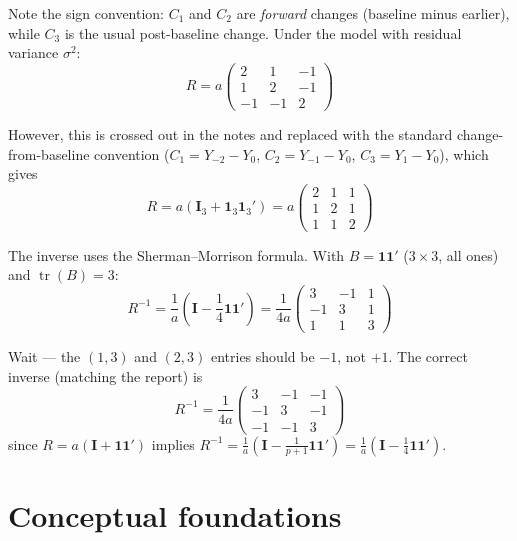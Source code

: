 \documentclass[11pt]{article}
\DeclareMathOperator{\tr}{tr}
\newcommand{\bI}{\mathbf{I}}
\newcommand{\bone}{\mathbf{1}}
\begin{document}
Note the sign convention: $C_1$ and $C_2$ are
\emph{forward} changes (baseline minus earlier), while
$C_3$ is the usual post-baseline change. Under the
model with residual variance $\sigma^2$:
\begin{equation}
  R = a\begin{pmatrix}
    2 & 1 & -1 \\ 1 & 2 & -1 \\ -1 & -1 & 2
  \end{pmatrix}
\end{equation}

However, this is crossed out in the notes and replaced
with the standard change-from-baseline convention
($C_1 = Y_{-2} - Y_0$, $C_2 = Y_{-1} - Y_0$,
$C_3 = Y_1 - Y_0$), which gives
\begin{equation}
  R = a(\bI_3 + \bone_3 \bone_3')
  = a\begin{pmatrix}
    2 & 1 & 1 \\ 1 & 2 & 1 \\ 1 & 1 & 2
  \end{pmatrix}
\end{equation}

The inverse uses the Sherman--Morrison formula. With
$B = \bone\bone'$ ($3 \times 3$, all ones) and
$\tr(B) = 3$:
\begin{equation}
  R^{-1} = \frac{1}{a}\left(
    \bI - \frac{1}{4}\bone\bone'
  \right)
  = \frac{1}{4a}\begin{pmatrix}
    3 & -1 & 1 \\ -1 & 3 & 1 \\ 1 & 1 & 3
  \end{pmatrix}
\end{equation}

Wait --- the $(1,3)$ and $(2,3)$ entries should be
$-1$, not $+1$. The correct inverse (matching the
report) is
\begin{equation}
  R^{-1} = \frac{1}{4a}\begin{pmatrix}
    3 & -1 & -1 \\ -1 & 3 & -1 \\ -1 & -1 & 3
  \end{pmatrix}
\end{equation}
since $R = a(\bI + \bone\bone')$ implies
$R^{-1} = \frac{1}{a}(\bI - \frac{1}{p+1}\bone\bone')
= \frac{1}{a}(\bI - \frac{1}{4}\bone\bone')$.


\section{Conceptual foundations}
\label{sec:concepts}
\end{document}
